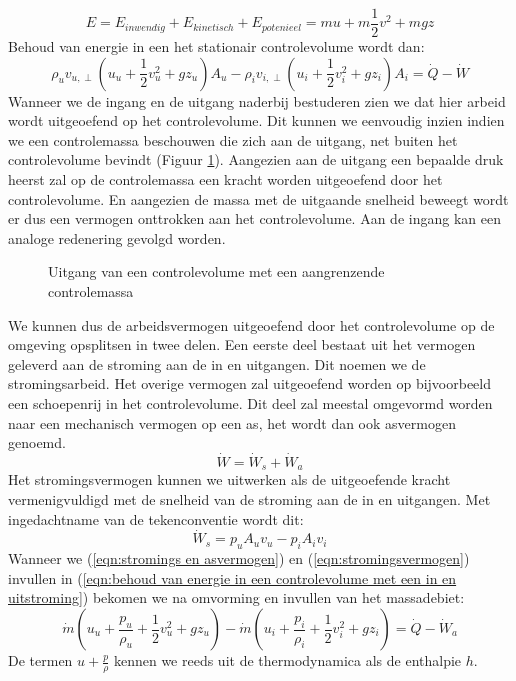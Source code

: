 \begin{equation}
	E = E_{inwendig} + E_{kinetisch} + E_{potenieel} = m u + m \frac{1}{2}v^2 + m g z
\end{equation}
Behoud van energie in een het stationair controlevolume wordt dan:
\begin{equation}
	\rho_{u} v_{u,\perp} (u_u + \frac{1}{2}v^2_u + g z_u) A_{u} - \rho_{i} v_{i,\perp} (u_i + \frac{1}{2}v^2_i + g z_i) A_{i} = \dot{Q}-\dot{W}
	\label{eqn:behoud van energie in een controlevolume met een in en uitstroming}
\end{equation}
Wanneer we de ingang en de uitgang naderbij bestuderen zien we dat hier arbeid wordt uitgeoefend op het controlevolume. Dit kunnen we eenvoudig inzien indien we een controlemassa beschouwen die zich aan de uitgang, net buiten het controlevolume bevindt (Figuur \ref{fig:stromingsarbeid}). Aangezien aan de uitgang een bepaalde druk heerst zal op de controlemassa een kracht worden uitgeoefend door het controlevolume. En aangezien de massa met de uitgaande snelheid beweegt wordt er dus een vermogen onttrokken aan het controlevolume. Aan de ingang kan een analoge redenering gevolgd worden.
\begin{figure}[htb]
	\centering
	
	\caption{Uitgang van een controlevolume met een aangrenzende controlemassa}
	\label{fig:stromingsarbeid}
\end{figure}
We kunnen dus de arbeidsvermogen uitgeoefend door het controlevolume op de omgeving opsplitsen in twee delen. Een eerste deel bestaat uit het vermogen geleverd aan de stroming aan de in en uitgangen. Dit noemen we de stromingsarbeid. Het overige vermogen zal uitgeoefend worden op bijvoorbeeld een schoepenrij in het controlevolume. Dit deel zal meestal omgevormd worden naar een mechanisch vermogen op een as, het wordt dan ook asvermogen genoemd.
\begin{equation}
	\dot{W} = \dot{W}_s + \dot{W}_a
	\label{eqn:stromings en asvermogen}
\end{equation}
Het stromingsvermogen kunnen we uitwerken als de uitgeoefende kracht vermenigvuldigd met de snelheid van de stroming aan de in en uitgangen. Met ingedachtname van de tekenconventie wordt dit:
\begin{equation}
	\dot{W}_s = p_u A_u v_u - p_i A_i v_i
	\label{eqn:stromingsvermogen}
\end{equation}
Wanneer we (\ref{eqn:stromings en asvermogen}) en (\ref{eqn:stromingsvermogen}) invullen in (\ref{eqn:behoud van energie in een controlevolume met een in en uitstroming}) bekomen we na omvorming en invullen van het massadebiet:
\begin{equation}
	\dot{m} (u_u + \frac{p_u}{\rho_u} + \frac{1}{2}v^2_u + g z_u) - \dot{m} (u_i + \frac{p_i}{\rho_i}+ \frac{1}{2}v^2_i + g z_i) = \dot{Q}-\dot{W}_a
	\label{eqn:behoud van energie in een controlevolume met een in en uitstroming asvermogen}
\end{equation}
De termen $u + \frac{p}{\rho}$ kennen we reeds uit de thermodynamica als de enthalpie $h$.

